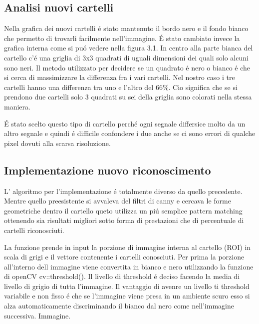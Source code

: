 	\subsection{Analisi nuovi cartelli}
		Nella grafica dei nuovi cartelli \'e stato mantenuto il bordo nero e il fondo bianco che permetto di trovarli facilmente nell'immagine. \'E stato cambiato invece la grafica interna come si pu\'o vedere nella figura 3.1. In centro alla parte bianca del cartello c'\'e una griglia di 3x3  quadrati di uguali dimensioni dei quali solo alcuni sono neri. Il metodo utilizzato per decidere se un quadrato \'e nero o bianco \'e che si cerca di massimizzare la differenza fra i vari cartelli. Nel nostro caso i tre cartelli hanno una differenza tra uno e l'altro del 66\%. Cio significa che se si prendono due cartelli solo 3 quadrati su sei della griglia sono colorati nella stessa maniera.
		
		\'E stato scelto questo tipo di cartello perch\'e ogni segnale differsice molto da un altro segnale e quindi \'e difficile confondere i due anche se ci sono errori di qualche pixel dovuti alla scarsa risoluzione.

	\subsection{Implementazione nuovo riconoscimento}
		L' algoritmo per l'implementazione \'e totalmente diverso da quello precedente. Mentre quello preesistente si avvaleva del filtri di canny e cercava le forme geometriche dentro il cartello queto utilizza un pi\'u semplice pattern matching ottenendo sia risultati migliori sotto forma di prestazioni che di percentuale di cartelli riconosciuti.

		La funzione prende in input la porzione di immagine interna al cartello (ROI) in scala di grigi e il vettore contenente i cartelli conosciuti. Per prima la porzione all'interno dell immagine viene convertita in bianco e nero utilizzando la funzione di openCV cv::threshold(). Il livello di threshold \'e deciso facendo la media di livello di grigio di tutta l'immagine. Il vantaggio di avenre un livello ti threshold variabile e non fisso \'e che se l'immagine viene presa in un ambiente scuro esso si alza automaticamente discriminando il bianco dal nero come nell'immagine successiva.
		Immagine.
		
